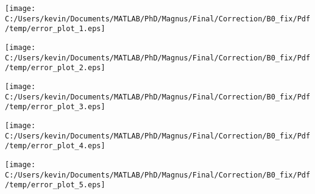 \begin{landscape}
\texttt{[image: C:/Users/kevin/Documents/MATLAB/PhD/Magnus/Final/Correction/B0\_fix/Pdf/temp/error\_plot\_1.eps]}
\end{landscape}
\begin{landscape}
\texttt{[image: C:/Users/kevin/Documents/MATLAB/PhD/Magnus/Final/Correction/B0\_fix/Pdf/temp/error\_plot\_2.eps]}
\end{landscape}
\begin{landscape}
\texttt{[image: C:/Users/kevin/Documents/MATLAB/PhD/Magnus/Final/Correction/B0\_fix/Pdf/temp/error\_plot\_3.eps]}
\end{landscape}
\begin{landscape}
\texttt{[image: C:/Users/kevin/Documents/MATLAB/PhD/Magnus/Final/Correction/B0\_fix/Pdf/temp/error\_plot\_4.eps]}
\end{landscape}
\begin{landscape}
\texttt{[image: C:/Users/kevin/Documents/MATLAB/PhD/Magnus/Final/Correction/B0\_fix/Pdf/temp/error\_plot\_5.eps]}
\end{landscape}
